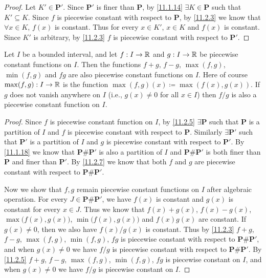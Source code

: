 \begin{proof}
  Let \(K' \in \mathbf{P}'\).
  Since \(\mathbf{P}'\) is finer than \(\mathbf{P}\), by \cref{11.1.14} \(\exists K \in \mathbf{P}\) such that \(K' \subseteq K\).
  Since \(f\) is piecewise constant with respect to \(\mathbf{P}\), by \cref{11.2.3} we know that \(\forall x \in K\), \(f(x)\) is constant.
  Thus for every \(x \in K'\), \(x \in K\) and \(f(x)\) is constant.
  Since \(K'\) is arbitrary, by \cref{11.2.3} \(f\) is piecewise constant with respect to \(\mathbf{P}'\).
\end{proof}

\begin{lem}\label{11.2.8}
  Let \(I\) be a bounded interval, and let \(f : I \to \mathbb{R}\) and \(g : I \to \mathbb{R}\) be piecewise constant functions on \(I\).
  Then the functions \(f + g\), \(f - g\), \(\max(f, g)\), \(\min(f, g)\) and \(fg\) are also piecewise constant functions on \(I\).
  Here of course \(\max(f, g) : I \to \mathbb{R}\) is the function \(\max(f, g)(x) \coloneqq \max(f(x), g(x))\).
  If \(g\) does not vanish anywhere on \(I\) (i.e., \(g(x) \neq 0\) for all \(x \in I\)) then \(f / g\) is also a piecewise constant function on \(I\).
\end{lem}

\begin{proof}
  Since \(f\) is piecewise constant function on \(I\), by \cref{11.2.5} \(\exists \mathbf{P}\) such that \(\mathbf{P}\) is a partition of \(I\) and \(f\) is piecewise constant with respect to \(\mathbf{P}\).
  Similarly \(\exists \mathbf{P}'\) such that \(\mathbf{P}'\) is a partition of \(I\) and \(g\) is piecewise constant with respect to \(\mathbf{P}'\).
  By \cref{11.1.18} we know that \(\mathbf{P} \# \mathbf{P}'\) is also a partition of \(I\) and \(\mathbf{P} \# \mathbf{P}'\) is both finer than \(\mathbf{P}\) and finer than \(\mathbf{P}'\).
  By \cref{11.2.7} we know that both \(f\) and \(g\) are piecewise constant with respect to \(\mathbf{P} \# \mathbf{P}'\).

  Now we show that \(f, g\) remain piecewise constant functions on \(I\) after algebraic operation.
  For every \(J \in \mathbf{P} \# \mathbf{P}'\), we have \(f(x)\) is constant and \(g(x)\) is constant for every \(x \in J\).
  Thus we know that \(f(x) + g(x)\), \(f(x) - g(x)\), \(\max\big(f(x), g(x)\big)\), \(\min\big(f(x), g(x)\big)\) and \(f(x) g(x)\) are constant.
  If \(g(x) \neq 0\), then we also have \(f(x) / g(x)\) is constant.
  Thus by \cref{11.2.3} \(f + g\), \(f - g\), \(\max(f, g)\), \(\min(f, g)\), \(fg\) is piecewise constant with respect to \(\mathbf{P} \# \mathbf{P}'\), and when \(g(x) \neq 0\) we have \(f / g\) is piecewise constant with respect to \(\mathbf{P} \# \mathbf{P}'\).
  By \cref{11.2.5} \(f + g\), \(f - g\), \(\max(f, g)\), \(\min(f, g)\), \(fg\) is piecewise constant on \(I\), and when \(g(x) \neq 0\) we have \(f / g\) is piecewise constant on \(I\).
\end{proof}

